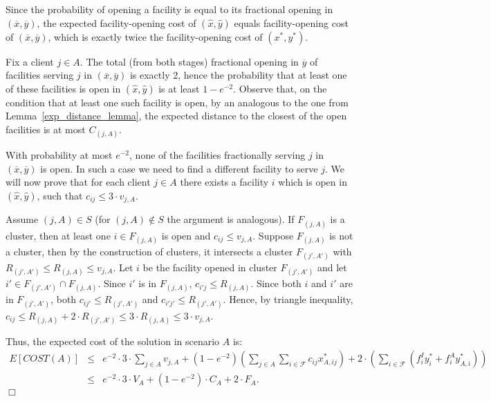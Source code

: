 \documentclass[11pt]{article}
\newcommand{\qed}{\nopagebreak \hfill $\Box$}
\newenvironment{proof}{\par \noindent {\em Proof:}}{\qed \par}
\newcommand{\F}{\mathcal{F}}
\begin{document}
\begin{proof}
Since the probability of opening a facility is
equal to its fractional opening in $(\overline{x},\overline{y})$, 
the expected facility-opening cost of $(\hat{x},\hat{y})$ 
equals facility-opening cost of $(\overline{x},\overline{y})$, which
is exactly twice the facility-opening cost of $(x^*,y^*)$.

Fix a client $j \in A$. The total (from both stages) fractional opening in $\overline{y}$ of facilities serving $j$ in 
$(\overline{x},\overline{y})$ is exactly 2, hence the probability that at least one of these 
facilities is open in $(\hat{x},\hat{y})$ is at least $1-e^{-2}$.
Observe that, on the condition that at least one such facility is open,
by an analogous to the one from Lemma~\ref{exp_distance_lemma}, 
the expected distance to the closest of the open facilities is at most $C_{(j,A)}$.

With probability at most $e^{-2}$, none of the facilities fractionally serving $j$
in $(\overline{x},\overline{y})$ is open. In such a case we need to find a different
facility to serve $j$. We will now prove that for each client $j \in A$ there exists a facility
$i$ which is open in $(\hat{x},\hat{y})$, such that $c_{ij} \leq 3 \cdot v_{j,A}$.

Assume $(j,A) \in S$ (for $(j,A) \notin S$ the argument is analogous). 
If $F_{(j,A)}$ is a cluster, then at least one $i \in F_{(j,A)}$ is open
and $c_{ij} \leq v_{j,A}$.
Suppose $F_{(j,A)}$ is not a cluster, then by the construction of clusters,
it intersects a cluster $F_{(j',A')}$ with $R_{(j',A')} \leq R_{(j,A)} \leq v_{j,A}$.
Let $i$ be the facility opened in cluster $F_{(j',A')}$ and let $i' \in F_{(j',A')} \cap F_{(j,A)}$.
Since $i'$ is in $F_{(j,A)}$, $c_{i'j} \leq R_{(j,A)}$. Since both $i$ and $i'$ are in $F_{(j',A')}$,
both $c_{ij'} \leq R_{(j',A')}$ and $c_{i'j'} \leq R_{(j',A')}$.
Hence, by triangle inequality, $c_{ij} \leq R_{(j,A)} + 2 \cdot R_{(j',A')} \leq 3 \cdot R_{(j,A)} \leq 3 \cdot v_{j,A}$.

Thus, the expected cost of the solution in scenario $A$ is:
\begin{eqnarray*} 
 E[COST(A)] & \leq & e^{-2} \cdot 3 \cdot \sum_{j \in A} v_{j,A} + 
 (1-e^{-2})  (\sum_{j\in A}\sum_{i\in \F} c_{ij}x^*_{A,ij}) + 
 2 \cdot (\sum_{i \in \F} (f_i^I y^*_{i} + f_i^A y^*_{A,i})) \\
 & \leq & e^{-2} \cdot 3 \cdot V_A + (1-e^{-2}) \cdot C_A + 2 \cdot F_A.
\end{eqnarray*}
\end{proof}
\end{document}
